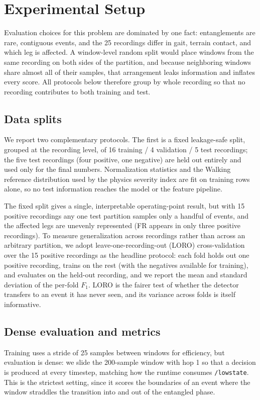 \documentclass[conference]{IEEEtran}
\begin{document}
\section{Experimental Setup}
Evaluation choices for this problem are dominated by one fact: entanglements are rare, contiguous events, and the 25 recordings differ in gait, terrain contact, and which leg is affected. A window-level random split would place windows from the same recording on both sides of the partition, and because neighboring windows share almost all of their samples, that arrangement leaks information and inflates every score. All protocols below therefore group by whole recording so that no recording contributes to both training and test.

\subsection{Data splits}
We report two complementary protocols. The first is a fixed leakage-safe split, grouped at the recording level, of 16 training / 4 validation / 5 test recordings; the five test recordings (four positive, one negative) are held out entirely and used only for the final numbers. Normalization statistics and the Walking reference distribution used by the physics severity index are fit on training rows alone, so no test information reaches the model or the feature pipeline.

The fixed split gives a single, interpretable operating-point result, but with 15 positive recordings any one test partition samples only a handful of events, and the affected legs are unevenly represented (FR appears in only three positive recordings). To measure generalization across recordings rather than across an arbitrary partition, we adopt leave-one-recording-out (LORO) cross-validation over the 15 positive recordings as the headline protocol: each fold holds out one positive recording, trains on the rest (with the negatives available for training), and evaluates on the held-out recording, and we report the mean and standard deviation of the per-fold $F_1$. LORO is the fairer test of whether the detector transfers to an event it has never seen, and its variance across folds is itself informative.

\subsection{Dense evaluation and metrics}
Training uses a stride of 25 samples between windows for efficiency, but evaluation is dense: we slide the 200-sample window with hop 1 so that a decision is produced at every timestep, matching how the runtime consumes \texttt{/lowstate}. This is the strictest setting, since it scores the boundaries of an event where the window straddles the transition into and out of the entangled phase.
\end{document}
